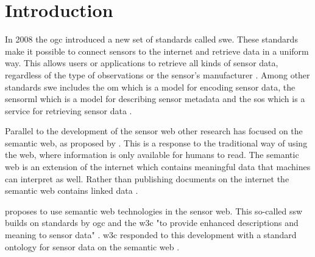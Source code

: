 
\chapter{Introduction}
\label{chap:introduction}

In 2008 the \ac{ogc} introduced a new set of standards called \ac{swe}. These standards make it possible to connect sensors to the internet and retrieve data in a uniform way. This allows users or applications to retrieve all kinds of sensor data, regardless of the type of observations or the sensor's manufacturer \citep{SW:Botts}. Among other standards \ac{swe} includes the \ac{om} which is a model for encoding sensor data, the \ac{sensorml} which is a model for describing sensor metadata and the \ac{sos} which is a service for retrieving sensor data \citep{SW:OGC}. 

Parallel to the development of the sensor web other research has focused on the semantic web, as proposed by \cite{LD:Berners-lee}. This is a response to the traditional way of using the web, where information is only available for humans to read. The semantic web is an extension of the internet which contains meaningful data that machines can interpret as well. Rather than publishing documents on the internet the semantic web contains linked data \citep{LD:Bizer}.    

\cite{SSW:Sheth} proposes to use semantic web technologies in the sensor web. This so-called \ac{ssw} builds on standards by \ac{ogc} and the \ac{w3c} "to provide enhanced descriptions and meaning to sensor data" \cite[p.78]{SSW:Sheth}. \ac{w3c} responded to this development with a standard ontology for sensor data on the semantic web \cite{SSW:SSN_incubatorGroup}. \\

















































